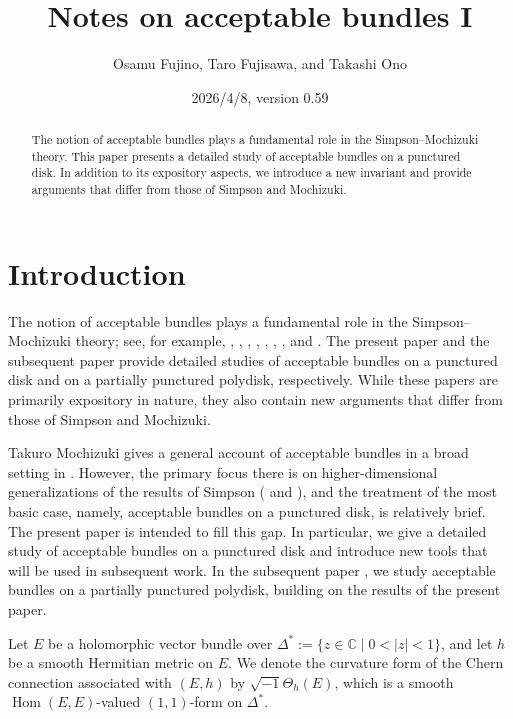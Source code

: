 \documentclass[12pt,twoside]{amsart}
\title{Notes on acceptable bundles I}
\author{Osamu Fujino, Taro Fujisawa, and Takashi Ono}
\date{2026/4/8, version 0.59}
\DeclareMathOperator{\Hom}{Hom}
\theoremstyle{definition}
\begin{document}
\begin{abstract} 
The notion of acceptable bundles plays a fundamental role in the Simpson--Mochizuki theory. This paper presents a detailed study of acceptable bundles on a punctured disk. In addition to its expository aspects, we introduce a new invariant and provide arguments that differ from those of Simpson and Mochizuki.
\end{abstract}

\maketitle 

\tableofcontents 

\section{Introduction}\label{p-sec1}

The notion of acceptable bundles plays a fundamental role in the Simpson--Mochizuki theory; see, for example, \cite{simpson1}, 
\cite{simpson2}, \cite{mochizuki1}, \cite{mochizuki2}, 
\cite{mochizuki3}, \cite{mochizuki4}, \cite{mochizuki5}, and 
\cite{mochizuki6}. The present paper and the subsequent paper 
\cite{ffo} provide detailed studies of acceptable bundles 
on a punctured disk and on a partially punctured polydisk, respectively. 
While these papers are primarily expository in nature, they also contain new arguments that differ from those of Simpson and Mochizuki. 

Takuro Mochizuki gives a general account 
of acceptable bundles in a broad setting 
in \cite[Chapter 21, Acceptable Bundles]{mochizuki4}. 
However, the primary focus there is on higher-dimensional 
generalizations of the results of Simpson (\cite{simpson1} 
and \cite{simpson2}), and the treatment of the most 
basic case, namely, acceptable bundles on a punctured disk, 
is relatively brief. 
The present paper is intended to fill this gap. 
In particular, we give a detailed study of acceptable bundles on a punctured disk and introduce new tools that will be used in subsequent work. 
In the subsequent paper \cite{ffo}, we study acceptable bundles on a partially punctured polydisk, building on the results of the present paper.

\medskip

Let $E$ be a holomorphic vector bundle over 
$\Delta^* := \{z \in \mathbb{C} \mid 0 < |z| < 1\}$, 
and let $h$ be a smooth Hermitian metric on $E$.  
We denote the curvature form of the Chern 
connection associated with $(E, h)$ by $\sqrt{-1}\Theta_h(E)$, 
which is a smooth $\Hom(E, E)$-valued $(1,1)$-form on $\Delta^*$.
\end{document}
